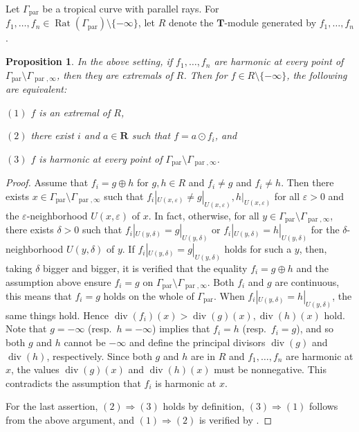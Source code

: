 \documentclass[a4paper,12pt]{amsart}
\newtheorem{prop}[dfn]{Proposition}
\def\Gamma{\varGamma}
\begin{document}
Let $\Gamma_{\operatorname{par}}$ be a tropical curve with parallel rays.
For $f_1, \ldots, f_n \in \operatorname{Rat}(\Gamma_{\operatorname{par}}) \setminus \{ -\infty \}$, let $R$ denote the $\boldsymbol{T}$-module generated by $f_1, \ldots, f_n$.

\begin{prop}
    \label{prop4-8-2}
In the above setting, if $f_1, \ldots, f_n$ are harmonic at every point of $\Gamma_{\operatorname{par}} \setminus \Gamma_{\operatorname{par}, \infty}$, then they are extremals of $R$.
Then for $f \in R \setminus \{ -\infty \}$, the following are equivalent:

$(1)$ $f$ is an extremal of $R$,

$(2)$ there exist $i$ and $a \in \boldsymbol{R}$ such that $f = a \odot f_i$, and

$(3)$ $f$ is harmonic at every point of $\Gamma_{\operatorname{par}} \setminus \Gamma_{\operatorname{par}, \infty}$.
\end{prop}

\begin{proof}
Assume that $f_i = g \oplus h$ for $g, h \in R$ and $f_i \not= g$ and $f_i \not= h$.
Then there exists $x \in \Gamma_{\operatorname{par}} \setminus \Gamma_{\operatorname{par}, \infty}$ such that $f_i|_{U(x, \varepsilon)} \not= g|_{U(x, \varepsilon)}, h|_{U(x, \varepsilon)}$ for all $\varepsilon > 0$ and the $\varepsilon$-neighborhood $U(x, \varepsilon)$ of $x$.
In fact, otherwise, for all $y \in \Gamma_{\operatorname{par}} \setminus \Gamma_{\operatorname{par}, \infty}$, there exists $\delta > 0$ such that $f_i|_{U(y, \delta)} = g|_{U(y, \delta)}$ or $f_i|_{U(y, \delta)} = h|_{U(y, \delta)}$ for the $\delta$-neighborhood $U(y, \delta)$ of $y$.
If $f_i|_{U(y, \delta)} = g|_{U(y, \delta)}$ holds for such a $y$, then, taking $\delta$ bigger and bigger, it is verified that the equality $f_i = g \oplus h$ and the assumption above ensure $f_i = g$ on $\Gamma_{\operatorname{par}} \setminus \Gamma_{\operatorname{par}, \infty}$.
Both $f_i$ and $g$ are continuous, this means that $f_i = g$ holds on the whole of $\Gamma_{\operatorname{par}}$.
When $f_i|_{U(y, \delta)} = h|_{U(y, \delta)}$, the same things hold.
Hence $\operatorname{div}(f_i)(x) > \operatorname{div}(g)(x), \operatorname{div}(h)(x)$ hold.
Note that $g = -\infty$ (resp.~$h = -\infty$) implies that $f_i = h$ (resp.~$f_i = g$), and so both $g$ and $h$ cannot be $-\infty$ and define the principal divisors $\operatorname{div}(g)$ and $\operatorname{div}(h)$, respectively.
Since both $g$ and $h$ are in $R$ and $f_1, \ldots, f_n$ are harmonic at $x$, the values $\operatorname{div}(g)(x)$ and $\operatorname{div}(h)(x)$ must be nonnegative.
This contradicts the assumption that $f_i$ is harmonic at $x$.

For the last assertion, $(2) \Longrightarrow (3)$ holds by definition, $(3) \Longrightarrow (1)$ follows from the above argument, and $(1) \Longrightarrow (2)$ is verified by \cite[Proposition~8 and its proof]{Haase=Musiker=Yu}.
\end{proof}
\end{document}
